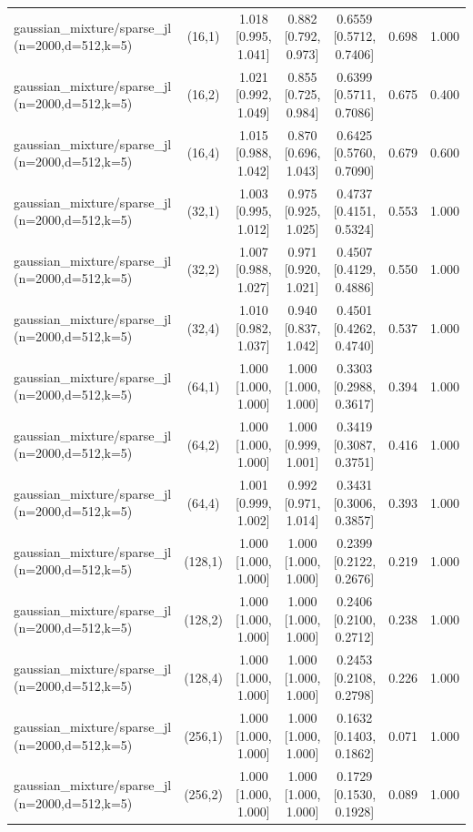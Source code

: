 \begin{tabular}{lcccccc}
gaussian\_mixture/sparse\_jl (n=2000,d=512,k=5) & (16,1) & 1.018 [0.995, 1.041] & 0.882 [0.792, 0.973] & 0.6559 [0.5712, 0.7406] & 0.698 & 1.000 \\
gaussian\_mixture/sparse\_jl (n=2000,d=512,k=5) & (16,2) & 1.021 [0.992, 1.049] & 0.855 [0.725, 0.984] & 0.6399 [0.5711, 0.7086] & 0.675 & 0.400 \\
gaussian\_mixture/sparse\_jl (n=2000,d=512,k=5) & (16,4) & 1.015 [0.988, 1.042] & 0.870 [0.696, 1.043] & 0.6425 [0.5760, 0.7090] & 0.679 & 0.600 \\
gaussian\_mixture/sparse\_jl (n=2000,d=512,k=5) & (32,1) & 1.003 [0.995, 1.012] & 0.975 [0.925, 1.025] & 0.4737 [0.4151, 0.5324] & 0.553 & 1.000 \\
gaussian\_mixture/sparse\_jl (n=2000,d=512,k=5) & (32,2) & 1.007 [0.988, 1.027] & 0.971 [0.920, 1.021] & 0.4507 [0.4129, 0.4886] & 0.550 & 1.000 \\
gaussian\_mixture/sparse\_jl (n=2000,d=512,k=5) & (32,4) & 1.010 [0.982, 1.037] & 0.940 [0.837, 1.042] & 0.4501 [0.4262, 0.4740] & 0.537 & 1.000 \\
gaussian\_mixture/sparse\_jl (n=2000,d=512,k=5) & (64,1) & 1.000 [1.000, 1.000] & 1.000 [1.000, 1.000] & 0.3303 [0.2988, 0.3617] & 0.394 & 1.000 \\
gaussian\_mixture/sparse\_jl (n=2000,d=512,k=5) & (64,2) & 1.000 [1.000, 1.000] & 1.000 [0.999, 1.001] & 0.3419 [0.3087, 0.3751] & 0.416 & 1.000 \\
gaussian\_mixture/sparse\_jl (n=2000,d=512,k=5) & (64,4) & 1.001 [0.999, 1.002] & 0.992 [0.971, 1.014] & 0.3431 [0.3006, 0.3857] & 0.393 & 1.000 \\
gaussian\_mixture/sparse\_jl (n=2000,d=512,k=5) & (128,1) & 1.000 [1.000, 1.000] & 1.000 [1.000, 1.000] & 0.2399 [0.2122, 0.2676] & 0.219 & 1.000 \\
gaussian\_mixture/sparse\_jl (n=2000,d=512,k=5) & (128,2) & 1.000 [1.000, 1.000] & 1.000 [1.000, 1.000] & 0.2406 [0.2100, 0.2712] & 0.238 & 1.000 \\
gaussian\_mixture/sparse\_jl (n=2000,d=512,k=5) & (128,4) & 1.000 [1.000, 1.000] & 1.000 [1.000, 1.000] & 0.2453 [0.2108, 0.2798] & 0.226 & 1.000 \\
gaussian\_mixture/sparse\_jl (n=2000,d=512,k=5) & (256,1) & 1.000 [1.000, 1.000] & 1.000 [1.000, 1.000] & 0.1632 [0.1403, 0.1862] & 0.071 & 1.000 \\
gaussian\_mixture/sparse\_jl (n=2000,d=512,k=5) & (256,2) & 1.000 [1.000, 1.000] & 1.000 [1.000, 1.000] & 0.1729 [0.1530, 0.1928] & 0.089 & 1.000 \\

\end{tabular}
